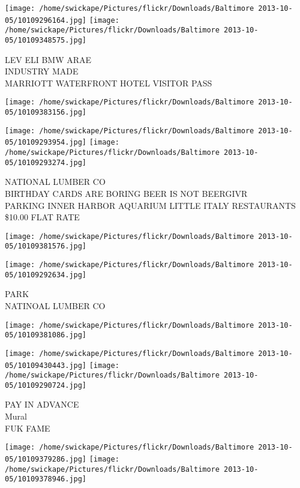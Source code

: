 \documentclass[10pt,letterpaper]{article}
\begin{document}
\vspace{0.25in}
\texttt{[image: /home/swickape/Pictures/flickr/Downloads/Baltimore 2013-10-05/10109296164.jpg]}
\texttt{[image: /home/swickape/Pictures/flickr/Downloads/Baltimore 2013-10-05/10109348575.jpg]}

LEV ELI BMW ARAE\\
INDUSTRY MADE\\
MARRIOTT WATERFRONT HOTEL VISITOR PASS
\pagebreak

\texttt{[image: /home/swickape/Pictures/flickr/Downloads/Baltimore 2013-10-05/10109383156.jpg]}

\vspace{0.25in}
\texttt{[image: /home/swickape/Pictures/flickr/Downloads/Baltimore 2013-10-05/10109293954.jpg]}
\texttt{[image: /home/swickape/Pictures/flickr/Downloads/Baltimore 2013-10-05/10109293274.jpg]}

NATIONAL LUMBER CO\\
BIRTHDAY CARDS ARE BORING BEER IS NOT BEERGIVR\\
PARKING INNER HARBOR AQUARIUM LITTLE ITALY RESTAURANTS \$10.00 FLAT RATE
\pagebreak

\texttt{[image: /home/swickape/Pictures/flickr/Downloads/Baltimore 2013-10-05/10109381576.jpg]}

\vspace{0.25in}
\texttt{[image: /home/swickape/Pictures/flickr/Downloads/Baltimore 2013-10-05/10109292634.jpg]}

PARK\\
NATINOAL LUMBER CO
\pagebreak

\texttt{[image: /home/swickape/Pictures/flickr/Downloads/Baltimore 2013-10-05/10109381086.jpg]}

\vspace{0.25in}
\texttt{[image: /home/swickape/Pictures/flickr/Downloads/Baltimore 2013-10-05/10109430443.jpg]}
\texttt{[image: /home/swickape/Pictures/flickr/Downloads/Baltimore 2013-10-05/10109290724.jpg]}

PAY IN ADVANCE\\
Mural\\
FUK FAME
\pagebreak

\texttt{[image: /home/swickape/Pictures/flickr/Downloads/Baltimore 2013-10-05/10109379286.jpg]}
\texttt{[image: /home/swickape/Pictures/flickr/Downloads/Baltimore 2013-10-05/10109378946.jpg]}
\end{document}
